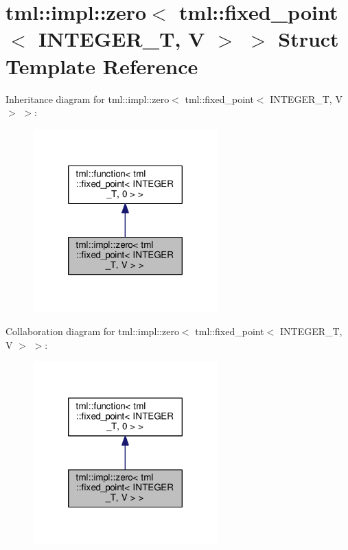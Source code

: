 \hypertarget{structtml_1_1impl_1_1zero_3_01tml_1_1fixed__point_3_01_i_n_t_e_g_e_r___t_00_01_v_01_4_01_4}{\section{tml\+:\+:impl\+:\+:zero$<$ tml\+:\+:fixed\+\_\+point$<$ I\+N\+T\+E\+G\+E\+R\+\_\+\+T, V $>$ $>$ Struct Template Reference}
\label{structtml_1_1impl_1_1zero_3_01tml_1_1fixed__point_3_01_i_n_t_e_g_e_r___t_00_01_v_01_4_01_4}
}


Inheritance diagram for tml\+:\+:impl\+:\+:zero$<$ tml\+:\+:fixed\+\_\+point$<$ I\+N\+T\+E\+G\+E\+R\+\_\+\+T, V $>$ $>$\+:
\nopagebreak
\begin{figure}[H]
\begin{center}
\leavevmode
\includegraphics[width=202pt]{structtml_1_1impl_1_1zero_3_01tml_1_1fixed__point_3_01_i_n_t_e_g_e_r___t_00_01_v_01_4_01_4__inherit__graph}
\end{center}
\end{figure}


Collaboration diagram for tml\+:\+:impl\+:\+:zero$<$ tml\+:\+:fixed\+\_\+point$<$ I\+N\+T\+E\+G\+E\+R\+\_\+\+T, V $>$ $>$\+:
\nopagebreak
\begin{figure}[H]
\begin{center}
\leavevmode
\includegraphics[width=202pt]{structtml_1_1impl_1_1zero_3_01tml_1_1fixed__point_3_01_i_n_t_e_g_e_r___t_00_01_v_01_4_01_4__coll__graph}
\end{center}
\end{figure}
